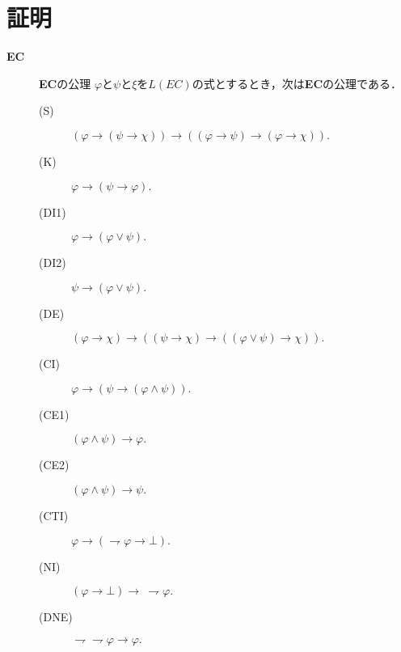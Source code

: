 \section{証明}
	\begin{description}
	\item[{\bf EC}]\mbox{}
	
	\begin{itembox}[l]{{\bf EC}の公理}
		$\varphi$と$\psi$と$\xi$を$L(EC)$の式とするとき，次は{\bf EC}の公理である．
		\begin{description}
			\item[(S)] $(\varphi \rightarrow (\psi \rightarrow \chi)) 
				\rightarrow ((\varphi \rightarrow \psi)
				\rightarrow (\varphi \rightarrow \chi)).$
			\item[(K)] $\varphi \rightarrow (\psi \rightarrow \varphi).$
			\item[(DI1)] $\varphi \rightarrow (\varphi \vee \psi).$
			\item[(DI2)] $\psi \rightarrow (\varphi \vee \psi).$
			\item[(DE)] $(\varphi \rightarrow \chi) \rightarrow 
				((\psi \rightarrow \chi) \rightarrow ((\varphi \vee \psi) \rightarrow \chi)).$
			\item[(CI)] $\varphi \rightarrow (\psi \rightarrow (\varphi \wedge \psi)).$
			\item[(CE1)] $(\varphi \wedge \psi) \rightarrow \varphi.$
			\item[(CE2)] $(\varphi \wedge \psi) \rightarrow \psi.$
				
			\item[(CTI)] $\varphi \rightarrow (\rightharpoondown \varphi \rightarrow \bot).$
			
			\item[(NI)] $(\varphi \rightarrow \bot) \rightarrow\ \rightharpoondown \varphi.$
			\item[(DNE)] $\rightharpoondown \rightharpoondown \varphi \rightarrow \varphi.$
		\end{description}
	\end{itembox}
	

\end{description}
